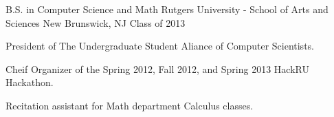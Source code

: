 

\begin{cventries}

	\cventry
	{B.S. in Computer Science and Math} %
	{Rutgers University - School of Arts and Sciences} %
	{New Brunswick, NJ} %
	{Class of 2013} %
	{
		\begin{cvitems} %
		\item {President of The Undergraduate Student Aliance of Computer Scientists.}
		\item {Cheif Organizer of the Spring 2012, Fall 2012, and Spring 2013 HackRU Hackathon.}
		\item {Recitation assistant for Math department Calculus classes.}
		\end{cvitems}
	}

\end{cventries}
